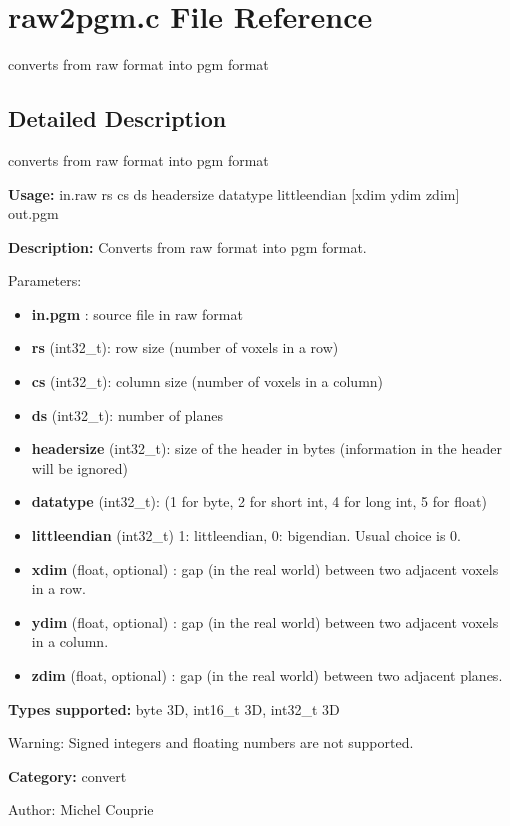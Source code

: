 \section{raw2pgm.c File Reference}
\label{raw2pgm_8c}
converts from raw format into pgm format 



\subsection{Detailed Description}
converts from raw format into pgm format 

{\bf Usage:} in.raw rs cs ds headersize datatype littleendian [xdim ydim zdim] out.pgm

{\bf Description:} Converts from raw format into pgm format.

Parameters: \begin{itemize}
\item {\bf in.pgm} : source file in raw format \item {\bf rs} (int32\_\-t): row size (number of voxels in a row) \item {\bf cs} (int32\_\-t): column size (number of voxels in a column) \item {\bf ds} (int32\_\-t): number of planes \item {\bf headersize} (int32\_\-t): size of the header in bytes (information in the header will be ignored) \item {\bf datatype} (int32\_\-t): (1 for byte, 2 for short int, 4 for long int, 5 for float) \item {\bf littleendian} (int32\_\-t) 1: littleendian, 0: bigendian. Usual choice is 0. \item {\bf xdim} (float, optional) : gap (in the real world) between two adjacent voxels in a row. \item {\bf ydim} (float, optional) : gap (in the real world) between two adjacent voxels in a column. \item {\bf zdim} (float, optional) : gap (in the real world) between two adjacent planes.\end{itemize}
{\bf Types supported:} byte 3D, int16\_\-t 3D, int32\_\-t 3D

\begin{Desc}
\item[Warning:]Signed integers and floating numbers are not supported.\end{Desc}
{\bf Category:} convert

\begin{Desc}
\item[Author:]Michel Couprie \end{Desc}
